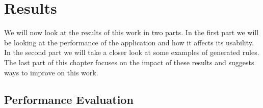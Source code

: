 \section{Results}



We will now look at the results of this work in two parts. In the first part we will be looking at the performance of the application and how it affects its usability. In the second part we will take a closer look at some examples of generated rules. The last part of this chapter focuses on the impact of these results and suggests ways to improve on this work. 


\subsection{Performance Evaluation}

